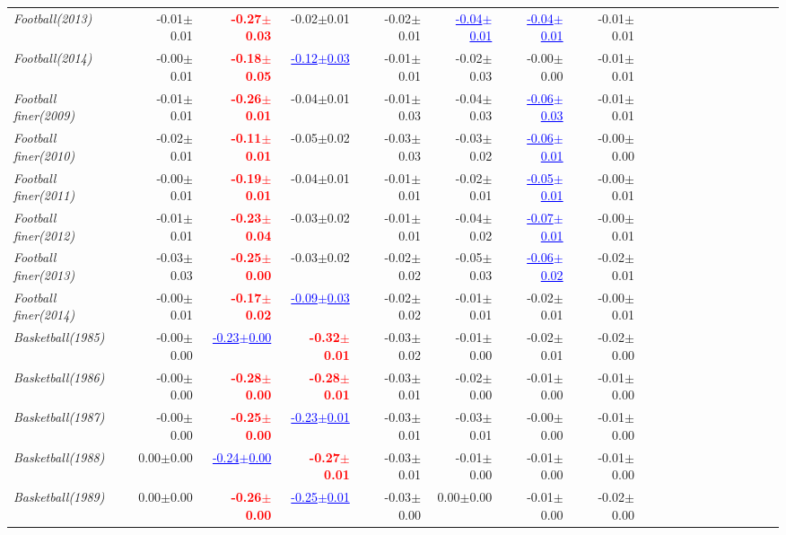 \documentclass[nohyperref]{article}
\theoremstyle{plain}
\theoremstyle{definition}
\theoremstyle{remark}
\newcommand{\red}[1]{\textcolor{red}{\textbf{#1}}}
\newcommand{\blue}[1]{\textcolor{blue}{\underline{#1}}}
\begin{document}
\begin{table*}[!ht]
{\begin{tabular}{lrrrrrrrrrrrrrrrrrr}
			{\it Football(2013)} & -0.01$\pm$0.01 & \red{-0.27$\pm$0.03} & -0.02$\pm$0.01 & -0.02$\pm$0.01 & \blue{-0.04$\pm$0.01} & \blue{-0.04$\pm$0.01} & -0.01$\pm$0.01 \\
			{\it Football(2014)} & -0.00$\pm$0.01 & \red{-0.18$\pm$0.05} & \blue{-0.12$\pm$0.03} & -0.01$\pm$0.01 & -0.02$\pm$0.03 & -0.00$\pm$0.00 & -0.01$\pm$0.01 \\
			{\it Football finer(2009)} & -0.01$\pm$0.01 & \red{-0.26$\pm$0.01} & -0.04$\pm$0.01 & -0.01$\pm$0.03 & -0.04$\pm$0.03 & \blue{-0.06$\pm$0.03} & -0.01$\pm$0.01 \\
			{\it Football finer(2010)} & -0.02$\pm$0.01 & \red{-0.11$\pm$0.01} & -0.05$\pm$0.02 & -0.03$\pm$0.03 & -0.03$\pm$0.02 & \blue{-0.06$\pm$0.01} & -0.00$\pm$0.00 \\
			{\it Football finer(2011)} & -0.00$\pm$0.01 & \red{-0.19$\pm$0.01} & -0.04$\pm$0.01 & -0.01$\pm$0.01 & -0.02$\pm$0.01 & \blue{-0.05$\pm$0.01} & -0.00$\pm$0.01 \\
			{\it Football finer(2012)} & -0.01$\pm$0.01 & \red{-0.23$\pm$0.04} & -0.03$\pm$0.02 & -0.01$\pm$0.01 & -0.04$\pm$0.02 & \blue{-0.07$\pm$0.01} & -0.00$\pm$0.01 \\
			{\it Football finer(2013)} & -0.03$\pm$0.03 & \red{-0.25$\pm$0.00} & -0.03$\pm$0.02 & -0.02$\pm$0.02 & -0.05$\pm$0.03 & \blue{-0.06$\pm$0.02} & -0.02$\pm$0.01 \\
			{\it Football finer(2014)} & -0.00$\pm$0.01 & \red{-0.17$\pm$0.02} & \blue{-0.09$\pm$0.03} & -0.02$\pm$0.02 & -0.01$\pm$0.01 & -0.02$\pm$0.01 & -0.00$\pm$0.01 \\
			{\it Basketball(1985)} & -0.00$\pm$0.00 & \blue{-0.23$\pm$0.00} & \red{-0.32$\pm$0.01} & -0.03$\pm$0.02 & -0.01$\pm$0.00 & -0.02$\pm$0.01 & -0.02$\pm$0.00 \\
			{\it Basketball(1986)} & -0.00$\pm$0.00 & \red{-0.28$\pm$0.00} & \red{-0.28$\pm$0.01} & -0.03$\pm$0.01 & -0.02$\pm$0.00 & -0.01$\pm$0.00 & -0.01$\pm$0.00 \\
			{\it Basketball(1987)} & -0.00$\pm$0.00 & \red{-0.25$\pm$0.00} & \blue{-0.23$\pm$0.01} & -0.03$\pm$0.01 & -0.03$\pm$0.01 & -0.00$\pm$0.00 & -0.01$\pm$0.00 \\
			{\it Basketball(1988)} & 0.00$\pm$0.00 & \blue{-0.24$\pm$0.00} & \red{-0.27$\pm$0.01} & -0.03$\pm$0.01 & -0.01$\pm$0.00 & -0.01$\pm$0.00 & -0.01$\pm$0.00 \\
			{\it Basketball(1989)} & 0.00$\pm$0.00 & \red{-0.26$\pm$0.00} & \blue{-0.25$\pm$0.01} & -0.03$\pm$0.00 & 0.00$\pm$0.00 & -0.01$\pm$0.00 & -0.02$\pm$0.00 \\

\end{tabular}}
\end{table*}
\end{document}
